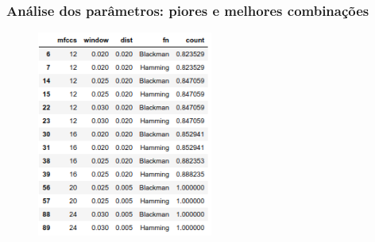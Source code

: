 \documentclass{beamer}
\begin{document}
\begin{frame}
    \frametitle{Análise dos parâmetros: piores e melhores combinações}

    \begin{figure}[]
        \centering
        \includegraphics[height=192pt]{Figure_6.png}
    \end{figure}

\end{frame}







\end{document}
